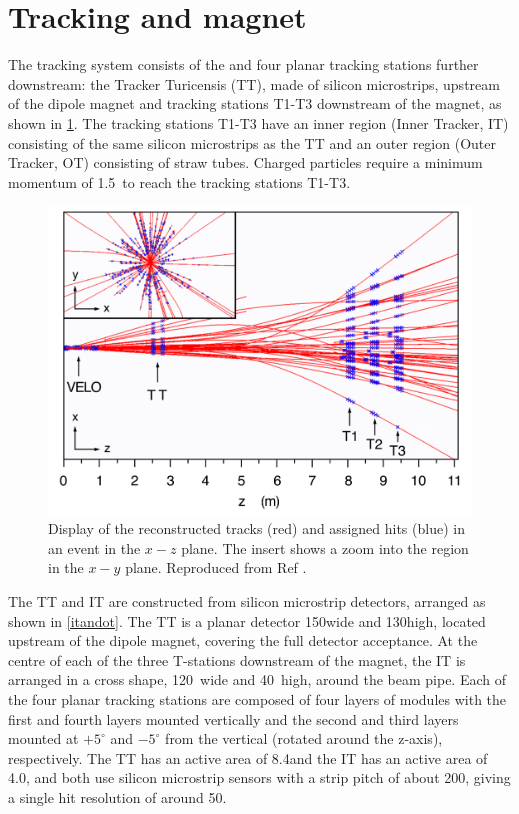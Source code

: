 \section{Tracking and magnet}
\label{sec:detector:tracking}

The \lhcb tracking system consists of the \velo and four planar tracking stations further downstream: the Tracker Turicensis (TT), made of silicon microstrips, upstream of the dipole magnet and tracking stations T1-T3 downstream of the magnet, as shown in \fig\ref{tracking}. The tracking stations T1-T3 have an inner region (Inner Tracker, IT) consisting of the same silicon microstrips as the TT and an outer region (Outer Tracker, OT) consisting of straw tubes. Charged particles require a minimum momentum of 1.5~\gevc to reach the tracking stations T1-T3.

\begin{figure}
\centering
\includegraphics[width=0.7\linewidth]{figures/detector/tracking.pdf}
\caption{Display of the reconstructed tracks (red) and assigned hits (blue) in an event in the $x-z$ plane. The insert shows a zoom into the \velo region in the $x-y$ plane. Reproduced from Ref \cite{LHCb-DP-2014-002}.}
\label{tracking}
\end{figure}

The TT and IT are constructed from silicon microstrip detectors, arranged as shown in \fig\ref{itandot}. The TT is a planar detector 150\cm wide and 130\cm high, located upstream of the dipole magnet, covering the full detector acceptance. At the centre of each of the three T-stations downstream of the magnet, the IT is arranged in a cross shape, 120~\cm wide and 40~\cm high, around the beam pipe. Each of the four planar tracking stations are composed of four layers of modules with the first and fourth layers mounted vertically and the second and third layers mounted at $+5^{\circ}$ and $-5^{\circ}$ from the vertical (rotated around the z-axis), respectively. The TT has an active area of 8.4\ma and the IT has an active area of 4.0\ma, and both use silicon microstrip sensors with a strip pitch of about
200\mum, giving a single hit resolution of around 50\mum.

